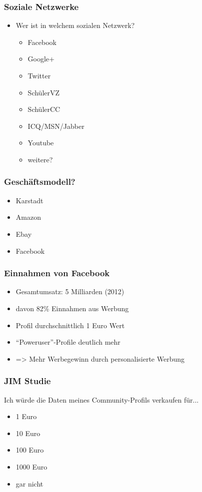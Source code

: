 \documentclass[12pt]{beamer}
\begin{document}
\begin{frame}
  \frametitle{Soziale Netzwerke}
  \begin{itemize}
    \item Wer ist in welchem sozialen Netzwerk?
      \begin{itemize}
        \item Facebook
        \item Google+
        \item Twitter
        \item SchülerVZ
        \item SchülerCC
        \item ICQ/MSN/Jabber
        \item Youtube
        \item weitere?
      \end{itemize}
  \end{itemize}
\end{frame}

\begin{frame}
  \frametitle{Geschäftsmodell?}
  \begin{itemize}
    \item<2-> Karstadt
    \item<3-> Amazon
    \item<4-> Ebay
    \item<5-> Facebook
  \end{itemize}
\end{frame}

\begin{frame}
  \frametitle{Einnahmen von Facebook}
  \begin{itemize}
    \item<1-> Gesamtumsatz: 5 Milliarden (2012)
    \item<2-> davon 82\% Einnahmen aus Werbung
    \item<4-> Profil durchschnittlich 1 Euro Wert
    \item<5-> "`Poweruser"'-Profile deutlich mehr
    \item<6-> => Mehr Werbegewinn durch personalisierte Werbung
  \end{itemize}
\end{frame}

\begin{frame}
  \frametitle{JIM Studie}
  \begin{center} \Large
    Ich würde die Daten meines Community-Profils verkaufen für...
  \end{center}
  \begin{itemize}
    \item<2-> 1 Euro
    \item<3-> 10 Euro
    \item<4-> 100 Euro
    \item<5-> 1000 Euro
    \item<7-> gar nicht
  \end{itemize}
\end{frame}
\end{document}
